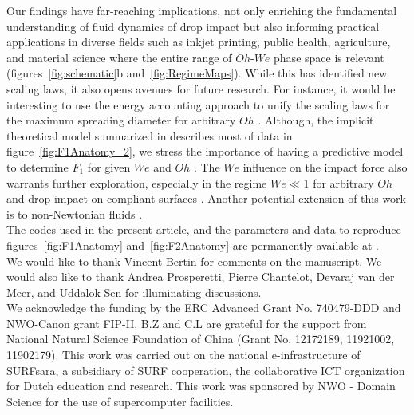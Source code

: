 \documentclass{jfm}
\begin{document}
Our findings have far-reaching implications, not only enriching the fundamental understanding of fluid dynamics of drop impact but also informing practical applications in diverse fields such as inkjet printing, public health, agriculture, and material science where the entire range of $Oh$-$We$ phase space is relevant (figures~\ref{fig:schematic}b and~\ref{fig:RegimeMaps}). While this has identified new scaling laws, it also opens avenues for future research. For instance, it would be interesting to use the energy accounting approach to unify the scaling laws for the maximum spreading diameter for arbitrary $Oh$ \citep{laan2014maximum, Wildeman2016}. Although, the implicit theoretical model summarized in \citet{cheng2021drop} describes most of data in figure~\ref{fig:F1Anatomy_2}, we stress the importance of having a predictive model to determine $F_1$ for given $We$ and $Oh$ \citep{sanjay2024PRL}. The $We$ influence on the impact force also warrants further exploration, especially in the regime $We \ll 1$ for arbitrary $Oh$ \citep{chevy2012liquid, molavcek2012quasi} and drop impact on compliant surfaces \citep{alventosa_cimpeanu_harris_2023, ma2023scaling}. Another potential extension of this work is to non-Newtonian fluids \citep{martouzet2021dynamic, aguero2022impact, bertin2023similarity, jin2023marbles}.\\[5mm] 

 The codes used in the present article, and the parameters and data to reproduce figures~\ref{fig:F1Anatomy} and~\ref{fig:F2Anatomy} are permanently available at \citet{basiliskVatsal}.\\

  We would like to thank Vincent Bertin for comments on the manuscript. We would also like to thank Andrea Prosperetti, Pierre Chantelot, Devaraj van der Meer, and Uddalok Sen for illuminating discussions.\\

 We acknowledge the funding by the ERC Advanced Grant No. 740479-DDD and NWO-Canon grant FIP-II. B.Z and C.L are grateful for the support from National Natural Science Foundation of China (Grant No. 12172189, 11921002, 11902179). This work was carried out on the national e-infrastructure of SURFsara, a subsidiary of SURF cooperation, the collaborative ICT organization for Dutch education and research. This work was sponsored by NWO - Domain Science for the use of supercomputer facilities.\\
\end{document}
